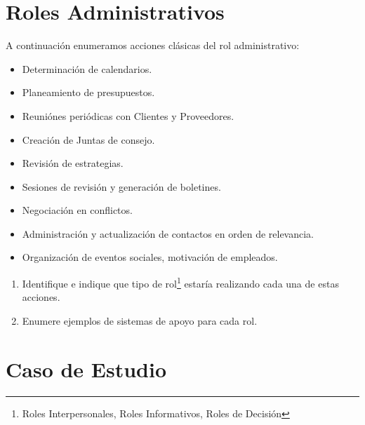 \documentclass{article}
\begin{document}
\section{Roles Administrativos}
A continuación enumeramos acciones clásicas del rol administrativo:
\begin{itemize}
    \item Determinación de calendarios. %
    \item Planeamiento de presupuestos. %
    \item Reuniónes periódicas con Clientes y Proveedores. %
    \item Creación de Juntas de consejo. %
    \item Revisión de estrategias. %
    \item Sesiones de revisión y generación de boletines. %
    \item Negociación en conflictos. %
    \item Administración  y actualización de contactos en orden de relevancia. %
    \item Organización de eventos sociales, motivación de empleados. %
\end{itemize}
\begin{enumerate}
    \item Identifique e indique que tipo de rol\footnote{Roles Interpersonales, Roles Informativos, Roles de Decisión} estaría realizando cada una de estas acciones.
    \item Enumere ejemplos de sistemas de apoyo para cada rol.
\end{enumerate}

\section{Caso de Estudio}
\end{document}
